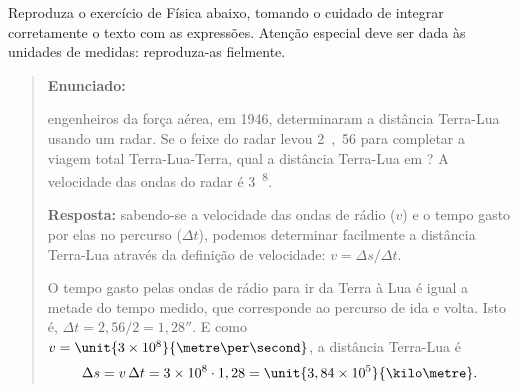 \documentclass[a4paper,10pt,twocolumn,landscape]{article}
\begin{document}
	
	\begin{exercicio} Reproduza o exercício de Física abaixo, tomando o cuidado de integrar corretamente o texto com as expressões. Atenção especial deve ser dada às unidades de medidas: reproduza-as fielmente.
	
		\bigskip
	
		\begin{quotation}
			\noindent
			\textbf{Enunciado:}
			\begin{slshape}
				engenheiros da força aérea, em 1946, determinaram a distância Terra-Lua usando um radar. Se o feixe do radar levou \unit{2,56}{\second} para completar a viagem total Terra-Lua-Terra, qual a distância Terra-Lua em \kilo\metre? A velocidade das ondas do radar é \unit{3^{8}}{\metre\per\second}.
			\end{slshape}
			
			\noindent\textbf{Resposta:} sabendo-se a velocidade das ondas de rádio (\(v\)) e o tempo gasto por elas no percurso (\(\Delta t\)), podemos determinar facilmente a distância Terra-Lua através da definição de velocidade: \(v = \Delta s/\Delta t\).
			
			O tempo gasto pelas ondas de rádio para ir da Terra à Lua é igual a metade do tempo medido, que corresponde ao percurso de ida e volta. Isto é, \(\Delta t = 2,56/2 = \unit{1,28}{\second}\). E como \(v = \unit{3 \times 10^{8}}{\metre\per\second}\), a distância Terra-Lua é
			\[
			\Delta s = v \,\Delta t = 3\times 10^{8} \cdot 1,28 = \unit{3,84 \times 10^{5}}{\kilo\metre}.
			\]
		\end{quotation}
	\end{exercicio}
\end{document}
